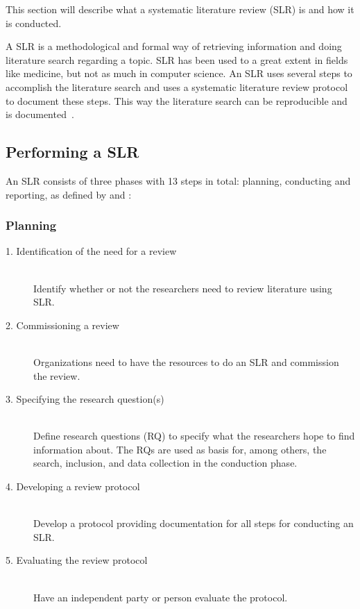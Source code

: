 This section will describe what a systematic literature review (SLR) is and how it is conducted. 

A SLR is a methodological and formal way of retrieving information and doing literature search regarding a topic. SLR has been used to a great extent in fields like medicine, but not as much in computer science. An SLR uses several steps to accomplish the literature search and uses a systematic literature review protocol to document these steps. This way the literature search can be reproducible and is documented~\citep{paper:slrdesc}.

\subsection{Performing a SLR}

An SLR consists of three phases with 13 steps in total: planning, conducting and reporting, as defined by \cite{paper:slrdesc} and \cite{master:slr}:

\subsubsection{Planning}

\begin{description}

	\item[1. Identification of the need for a review] \hfill \\
		Identify whether or not the researchers need to review literature using SLR.

	\item[2. Commissioning a review] \hfill \\
		Organizations need to have the resources to do an SLR and commission the review.

	\item[3. Specifying the research question(s)] \hfill \\
		Define research questions (RQ) to specify what the researchers hope to find information about. The RQs are used as basis for, among others, the search, inclusion, and data collection in the conduction phase. 

	\item[4. Developing a review protocol] \hfill \\
		Develop a protocol providing documentation for all steps for conducting an SLR.
	

	\item[5. Evaluating the review protocol] \hfill \\
		Have an independent party or person evaluate the protocol.

\end{description}

